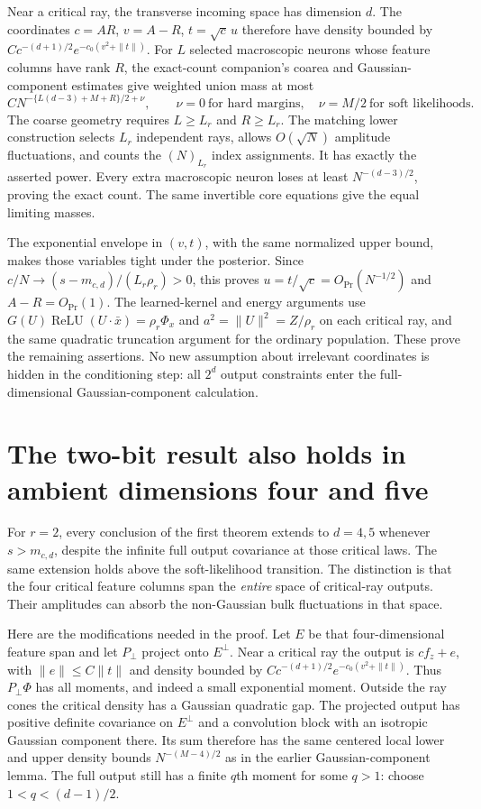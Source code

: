 \documentclass[11pt]{article}
\newcommand{\relu}{\operatorname{ReLU}}
\begin{document}
Near a critical ray, the transverse incoming space has dimension $d$.
The coordinates $c=AR$, $v=A-R$, $t=\sqrt c\,u$ therefore have density
bounded by
$Cc^{-(d+1)/2}e^{-c_0(v^2+\|t\|)}$.
For $L$ selected macroscopic neurons whose feature columns have rank $R$,
the exact-count companion's coarea and Gaussian-component estimates give
weighted union mass at most
\[
 C N^{-\{L(d-3)+M+R\}/2+\nu},\qquad
 \nu=0\ \text{for hard margins},\quad \nu=M/2\ \text{for soft likelihoods}.
\]
The coarse geometry requires $L\ge L_r$ and $R\ge L_r$.
The matching lower construction selects $L_r$ independent rays, allows
$O(\sqrt N)$ amplitude fluctuations, and counts the $(N)_{L_r}$ index
assignments. It has exactly the asserted power. Every extra macroscopic
neuron loses at least $N^{-(d-3)/2}$, proving the exact count.
The same invertible core equations give the equal limiting masses.

The exponential envelope in $(v,t)$, with the same normalized upper
bound, makes those variables tight under the posterior. Since
$c/N\to(s-m_{c,d})/(L_r\rho_r)>0$, this proves
$u=t/\sqrt c=O_{\Pr}(N^{-1/2})$ and $A-R=O_{\Pr}(1)$.
The learned-kernel and energy arguments use
$G(U)\relu(U\cdot\bar x)=\rho_r\Phi_x$ and
$a^2=\|U\|^2=Z/\rho_r$ on each critical ray, and the same quadratic
truncation argument for the ordinary population. These prove the
remaining assertions. No new assumption about irrelevant coordinates
is hidden in the conditioning step: all $2^d$ output constraints enter
the full-dimensional Gaussian-component calculation.

\section{The two-bit result also holds in ambient dimensions four and five}
For $r=2$, every conclusion of the first theorem extends to $d=4,5$
whenever $s>m_{c,d}$, despite the infinite full output covariance at
those critical laws. The same extension holds above the soft-likelihood
transition. The distinction is that the four critical feature columns
span the \emph{entire} space of critical-ray outputs. Their amplitudes
can absorb the non-Gaussian bulk fluctuations in that space.

Here are the modifications needed in the proof. Let $E$ be that
four-dimensional feature span and let $P_\perp$ project onto $E^\perp$.
Near a critical ray the output is $cf_z+e$, with
$\|e\|\le C\|t\|$ and density bounded by
$Cc^{-(d+1)/2}e^{-c_0(v^2+\|t\|)}$. Thus $P_\perp\Phi$ has all
moments, and indeed a small exponential moment. Outside the ray cones
the critical density has a Gaussian quadratic gap. The projected output
has positive definite covariance on $E^\perp$ and a convolution block
with an isotropic Gaussian component there. Its sum therefore has the
same centered local lower and upper density bounds
$N^{-(M-4)/2}$ as in the earlier Gaussian-component lemma.
The full output still has a finite $q$th moment for some $q>1$:
choose $1<q<(d-1)/2$.
\end{document}
